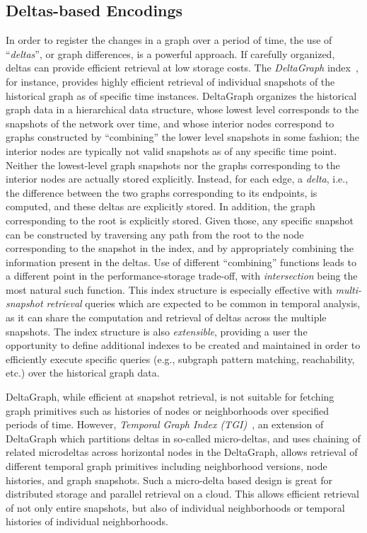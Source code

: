 \documentclass{svjour3}
\begin{document}
\subsection{Deltas-based Encodings}
In order to register the changes in a graph over a period of time, the use of ``{\em deltas}'', or graph differences, is a powerful approach. If carefully organized, deltas can provide efficient retrieval at low storage costs. 
The {\em DeltaGraph} index~\cite{khurana2013efficient}, for instance, provides highly efficient retrieval of individual snapshots of the historical graph as of specific time instances. DeltaGraph organizes the historical graph data in a hierarchical data structure, whose lowest level corresponds
to the snapshots of the network over time, and whose interior nodes correspond to graphs constructed by ``combining''
the lower level snapshots in some fashion; the interior nodes are typically not valid snapshots as of any specific time point. Neither the lowest-level
graph snapshots nor the graphs corresponding to the interior nodes are actually stored explicitly. Instead, for each edge, a {\em delta}, i.e., the
difference between the two graphs corresponding to its endpoints, is computed, and these deltas are explicitly stored. In addition, the graph
corresponding to the root is explicitly stored. Given those, any specific snapshot can be constructed by traversing any
path from the root to the node corresponding to the snapshot in the index, and by appropriately combining the information present in the deltas.
Use of different ``combining'' functions leads to a different point in the performance-storage trade-off, with {\em intersection} being the most
natural such function.  This index structure is especially effective with {\em multi-snapshot retrieval} queries which are expected to be common in temporal 
analysis, as it can share the computation and retrieval of deltas across the multiple snapshots.
The index structure is also {\em extensible}, providing a user the opportunity to define additional 
indexes to be created and maintained in order to efficiently execute specific queries (e.g., subgraph pattern matching, reachability, etc.)
    over the historical graph data.

DeltaGraph, while efficient at snapshot retrieval, is not suitable for fetching graph primitives such as histories of nodes or neighborhoods over specified periods of time. However, {\em Temporal Graph Index (TGI)}~\cite{khurana2016storing}, an extension of DeltaGraph which partitions deltas in so-called micro-deltas, and uses chaining of related microdeltas across horizontal nodes in the DeltaGraph, allows retrieval of different temporal graph primitives including neighborhood versions, node histories, and graph snapshots. 
Such a micro-delta based design is great for distributed storage and parallel retrieval on a cloud. This allows efficient retrieval of not only
entire snapshots, but also of individual neighborhoods or temporal histories of individual neighborhoods.
\end{document}
